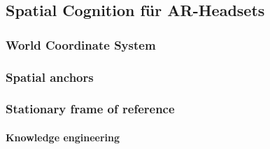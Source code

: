 \subsection{Spatial Cognition für AR-Headsets}\label{subsec:spatial-cognition-fuer-ar-headsets}
    \subsubsection{World Coordinate System}\label{subsubsec:world-coordinate-system}
    \subsubsection{Spatial anchors}\label{subsubsec:spatial-anchors}
    \subsubsection{Stationary frame of reference}\label{subsubsec:stationary-frame-of-reference}
        \paragraph{Knowledge engineering}~\autocite{wikipedia-contributors-2023C}